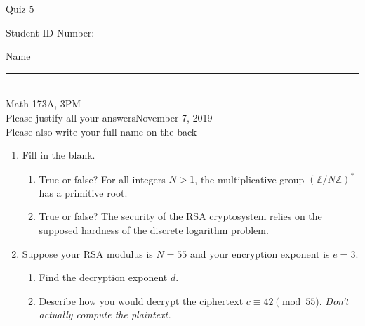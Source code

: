 \documentclass[12pt]{article}
\newcommand{\ints}{\mathbb{Z}}
\begin{document}
\begin{flushleft} 
\centerline{\LARGE{Quiz 5}} 
\vspace{5 mm}
{Student ID Number:}\hfill  
{Name \rule {2 in}{0.01in}}\\
Math 173A, 3PM
\\
{Please justify all your answers}\hfill {November 7, 2019}
\\
{Please also write your full name on the back} 

\medskip
\end{flushleft}

\begin{enumerate}
	\item Fill in the blank.
	\begin{enumerate}
		\item True or false? For all integers $N>1$, the multiplicative group $(\ints/N\ints)^*$ has a primitive root.
		\item True or false? The security of the RSA cryptosystem relies on the supposed hardness of the discrete logarithm problem.
	\end{enumerate}

	\item Suppose your RSA modulus is $N = 55$ and your encryption exponent is $e = 3$.
	\begin{enumerate}
		\item Find the decryption exponent $d$.
		\vfill
		\item Describe how you would decrypt the ciphertext $c \equiv 42\pmod{55}$. \textit{Don't actually compute the plaintext.}
		\vfill
	\end{enumerate}
\end{enumerate}

\end{document}
